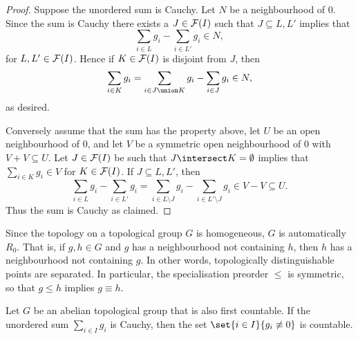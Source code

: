\documentclass[article, a4paper, 11pt, oneside]{memoir}
\numberwithin{equation}{chapter}
\begin{document}
\begin{proof}
    Suppose the unordered sum is Cauchy. Let $N$ be a neighbourhood of $0$. Since the sum is Cauchy there exists a $J \in \mathcal{F}(I)$ such that $J \subseteq L,L'$ implies that
    \begin{equation*}
        \sum_{i \in L} g_i - \sum_{i \in L'} g_i
            \in N,
    \end{equation*}
    for $L,L' \in \mathcal{F}(I)$. Hence if $K \in \mathcal{F}(I)$ is disjoint from $J$, then
    \begin{equation*}
        \sum_{i \in K} g_i
            = \sum_{i \in J \union K} g_i - \sum_{i \in J} g_i
            \in N,
    \end{equation*}
    as desired.

    Conversely assume that the sum has the property above, let $U$ be an open neighbourhood of $0$, and let $V$ be a symmetric open neighbourhood of $0$ with $V + V \subseteq U$. Let $J \in \mathcal{F}(I)$ be such that $J \intersect K = \emptyset$ implies that $\sum_{i \in K} g_i \in V$ for $K \in \mathcal{F}(I)$. If $J \subseteq L,L'$, then
    \begin{equation*}
        \sum_{i \in L} g_i - \sum_{i \in L'} g_i
            = \sum_{i \in L \setminus J} g_i - \sum_{i \in L' \setminus J} g_i
            \in V - V
            \subseteq U.
    \end{equation*}
    Thus the sum is Cauchy as claimed. %
\end{proof}


Since the topology on a topological group $G$ is homogeneous, $G$ is automatically $R_0$. That is, if $g,h \in G$ and $g$ has a neighbourhood not containing $h$, then $h$ has a neighbourhood not containing $g$. In other words, topologically distinguishable points are separated. In particular, the specialisation preorder $\leq$ is symmetric, so that $g \leq h$ implies $g \equiv h$.

\begin{lemma}
    Let $G$ be an abelian topological group that is also first countable. If the unordered sum $\sum_{i \in I} g_i$ is Cauchy, then the set $\set{i \in I}{g_i \not\equiv 0}$ is countable.
\end{lemma}
\end{document}
